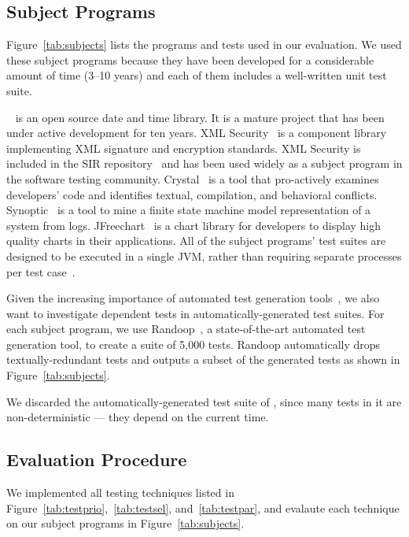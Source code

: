 \subsection{Subject Programs}
\label{sec:subj}

Figure~\ref{tab:subjects} lists the programs and
tests used in our evaluation. We used these subject
programs because they have been developed for
a considerable amount of time (3--10 years) and each
of them includes a well-written unit test suite.

\jt~\cite{jodatime} is an open source
date and time library. It is a mature project that
has been under active development
for ten years. XML Security~\cite{xmlsecurity}
is a component library implementing XML signature and encryption
standards. XML Security is included in
the SIR repository~\cite{sir} and has been used widely
as a subject program in the software testing community.
Crystal~\cite{crystal} is a tool that
pro-actively examines developers' code and
identifies textual, compilation, and behavioral conflicts.
Synoptic~\cite{synoptic} is a tool to mine a finite state
machine model representation of a system from logs.
JFreechart~\cite{jfreechart} is a chart library for developers to display
high quality charts in their applications.
All of the subject programs' test suites are designed to be executed in
a single JVM, rather than requiring separate processes per test case~\cite{vmvm}.

Given the increasing importance of automated test generation
tools~\cite{PachecoLET2007, ZhangSBE2011, Csallner:2004, fraseretal:ISSTA:2011},
we also want to investigate dependent tests in automatically-generated
test suites. For each subject program, we use
Randoop~\cite{PachecoLET2007}, a state-of-the-art automated
test generation tool, to create a suite of 5,000 tests.
Randoop automatically drops textually-redundant tests 
and outputs a subset of the generated tests as
shown in Figure~\ref{tab:subjects}.

We discarded the automatically-generated test suite of
\jt, since many tests in it are non-deterministic ---
they depend on the current time.


\subsection{Evaluation Procedure}
\label{sec:evalmethod}

We implemented all testing techniques listed
in Figure~\ref{tab:testprio},~\ref{tab:testsel},
and~\ref{tab:testpar}, and evalaute
each technique on our subject programs in
Figure~\ref{tab:subjects}.

